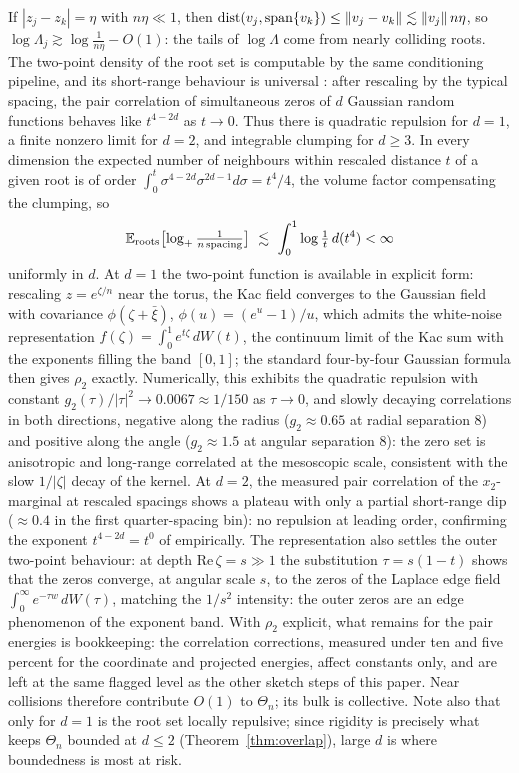 If $|z_j-z_k| = \eta$ with $n\eta\ll1$, then
$\operatorname{dist}(v_j,\operatorname{span}\{v_k\})\le\|v_j-v_k\|\lesssim\|v_j\|\,n\eta$, so
$\log\Lambda_j\gtrsim\log\frac1{n\eta} - O(1)$: the tails of $\log\Lambda$ come from nearly
colliding roots. The two-point density of the root set is computable by the same
conditioning pipeline, and its short-range behaviour is universal
\cite{bleher2000universality}: after rescaling by the typical spacing, the pair correlation
of simultaneous zeros of $d$ Gaussian random functions behaves like $t^{4-2d}$ as $t\to0$.
Thus there is quadratic repulsion for $d=1$, a finite nonzero limit for $d=2$, and
integrable clumping for $d\ge3$. In every dimension the expected number of neighbours within
rescaled distance $t$ of a given root is of order
$\int_0^t\sigma^{4-2d}\sigma^{2d-1}d\sigma = t^4/4$, the volume factor compensating the
clumping, so
\[
  \mathbb{E}_{\mathrm{roots}}\bigl[\log_+\tfrac1{n\,\mathrm{spacing}}\bigr]
  \ \lesssim\ \int_0^1\log\tfrac1t\,d(t^4) < \infty
\]
uniformly in $d$. At $d=1$ the two-point function is available in explicit form: rescaling
$z = e^{\zeta/n}$ near the torus, the Kac field converges to the Gaussian field with
covariance $\phi(\zeta+\bar\xi)$, $\phi(u) = (e^u-1)/u$, which admits the white-noise
representation $f(\zeta) = \int_0^1e^{t\zeta}\,dW(t)$, the continuum limit of the Kac sum
with the exponents filling the band $[0,1]$; the standard four-by-four Gaussian formula then
gives $\rho_2$ exactly. Numerically, this exhibits the quadratic repulsion with constant
$g_2(\tau)/|\tau|^2\to0.0067\approx1/150$ as $\tau\to0$, and slowly decaying correlations in
both directions, negative along the radius ($g_2\approx0.65$ at radial separation $8$) and
positive along the angle ($g_2\approx1.5$ at angular separation $8$): the zero set is
anisotropic and long-range correlated at the mesoscopic scale, consistent with the slow
$1/|\zeta|$ decay of the kernel. At $d=2$, the measured pair correlation of the
$x_2$-marginal at rescaled spacings shows a plateau with only a partial short-range dip
($\approx0.4$ in the first quarter-spacing bin): no repulsion at leading order, confirming
the exponent $t^{4-2d} = t^0$ of \cite{bleher2000universality} empirically. The
representation also settles the outer two-point behaviour: at depth
$\mathrm{Re}\,\zeta = s\gg1$ the substitution $\tau = s(1-t)$ shows that the zeros converge,
at angular scale $s$, to the zeros of the Laplace edge field
$\int_0^\infty e^{-\tau w}\,dW(\tau)$, matching the $1/s^2$ intensity: the outer zeros are
an edge phenomenon of the exponent band. With $\rho_2$ explicit, what remains for the pair
energies is bookkeeping: the correlation corrections, measured under ten and five percent
for the coordinate and projected energies, affect constants only, and are left at the same
flagged level as the other sketch steps of this paper. Near collisions therefore contribute
$O(1)$ to $\Theta_n$; its bulk is collective. Note also that only for $d=1$ is the root set
locally repulsive; since rigidity is precisely what keeps $\Theta_n$ bounded at $d\le2$
(Theorem~\ref{thm:overlap}), large $d$ is where boundedness is most at risk.


